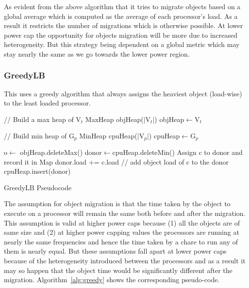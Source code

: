  As evident from the above algorithm that it tries to migrate objects based on
 a global average which is computed as the average of each processor's load.
 As a result it restricts the number of migrations which is otherwise possible.
 At lower power cap  the opportunity for objects migration will be more due to
 increased heterogeneity.  But this strategy being dependent on a global metric
 which may stay nearly the same as we go towards the lower power region.

\subsubsection{GreedyLB}
This uses a greedy algorithm that always assigns the heaviest object (load-wise) to the
least loaded processor. 

\begin{algorithm}

 // Build a max heap of V$_t$ \;
 MaxHeap objHeap($|$V$_t|$)\;
 objHeap$\leftarrow$V$_t$ \; 

 // Build min heap of G$_p$\;
 MinHeap cpuHeap($|$V$_p|$)\;
 cpuHeap$\leftarrow$G$_p$\;  

  {
    o$\leftarrow$ objHeap.deleteMax()\;
    donor$\leftarrow$cpuHeap.deleteMin()\;
    Assign c to donor and record it in Map\;
    donor.load += c.load // add object load of c to the donor\;
    cpuHeap.insert(donor) \;
    }
 \caption{GreedyLB Pseudocode}
 \label{alg:greedy}
\end{algorithm}

The assumption for object migration is that the time taken by the object to
execute on a processor will remain the same both before and after the
migration.  This assumption is valid at higher power caps because (1) all the
objects are of same size and (2) at higher power capping values the processors
are running at nearly the same frequencies and hence the time taken by a chare
to run any of them is nearly equal.  But these assumptions fall apart at lower
power caps because of the heterogeneity introduced between the processors and
as a result it may so happen that the object time would be 
significantly different after the migration.  Algorithm~\ref{alg:greedy} shows
the corresponding pseudo-code.

